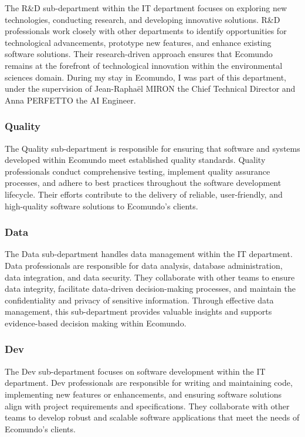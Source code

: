 \documentclass[a4paper,12pt,twoside]{report}
\begin{document}
The R\&D sub-department within the IT department focuses on exploring new technologies, conducting research, and developing innovative solutions. R\&D professionals work closely with other departments to identify opportunities for technological advancements, prototype new features, and enhance existing software solutions. Their research-driven approach ensures that Ecomundo remains at the forefront of technological innovation within the environmental sciences domain.
During my stay in Ecomundo, I was part of this department, under the supervision of Jean-Raphaël MIRON the Chief Technical Director and Anna PERFETTO the AI Engineer.

\subsubsection{Quality}

The Quality sub-department is responsible for ensuring that software and systems developed within Ecomundo meet established quality standards. Quality professionals conduct comprehensive testing, implement quality assurance processes, and adhere to best practices throughout the software development lifecycle. Their efforts contribute to the delivery of reliable, user-friendly, and high-quality software solutions to Ecomundo's clients.

\subsubsection{Data}

The Data sub-department handles data management within the IT department. Data professionals are responsible for data analysis, database administration, data integration, and data security. They collaborate with other teams to ensure data integrity, facilitate data-driven decision-making processes, and maintain the confidentiality and privacy of sensitive information. Through effective data management, this sub-department provides valuable insights and supports evidence-based decision making within Ecomundo.

\subsubsection{Dev}

The Dev sub-department focuses on software development within the IT department. Dev professionals are responsible for writing and maintaining code, implementing new features or enhancements, and ensuring software solutions align with project requirements and specifications. They collaborate with other teams to develop robust and scalable software applications that meet the needs of Ecomundo's clients.
\end{document}
